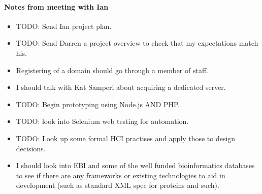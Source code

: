\paragraph{Notes from meeting with Ian}
\begin{itemize}
\item TODO: Send Ian project plan.
\item TODO: Send Darren a project overview to check that my expectations match
  his.
\item Registering of a domain should go through a member of staff.
\item I should talk with Kat Samperi about acquiring a dedicated server.
\item TODO: Begin prototyping using Node.js AND PHP.
\item TODO: look into Selenium web testing for automation.
\item TODO: Look up some formal HCI practises and apply those to design
  decisions.
\item I should look into EBI and some of the well funded bioinformatics
  databases to see if there are any frameworks or existing technologies to aid
  in development (such as standard XML spec for proteins and such).
\end{itemize}
